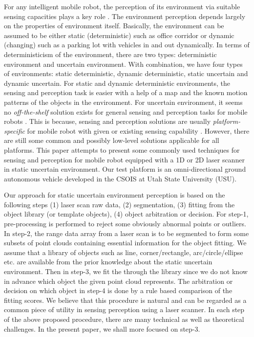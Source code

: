 \documentclass{cdcarta4}
\begin{document}
For any intelligent mobile robot, the perception of its environment via suitable sensing capacities plays a key role \cite{Adams99,Nourbakhsh97}. The  environment perception depends largely on the properties of environment itself. Basically, the environment can be assumed to be either static (deterministic) such as office corridor  or dynamic (changing) such as a   parking lot with vehicles in and out dynamically. In terms of 
deterministicism of the environment, there are two types: deterministic environment and uncertain environment.
With combination, we have four types of environments: static deterministic, dynamic deterministic, static uncertain and dynamic uncertain. For static and dynamic deterministic environments, the sensing and perception task is easier with a help of a map and the known motion patterns of the objects in the environment. For uncertain environment, it seems no {\em off-the-shelf} solution exists for general sensing and perception tasks for mobile robots \cite{Adams99}. This is because,  sensing and perception  solutions  are usually {\em platform-specific}  for mobile robot with given or existing sensing capability \cite{Adams99,Nourbakhsh97}. However, there are still some common and possibly low-level solutions applicable for all platforms. This paper attempts to present some commonly used  techniques for sensing and perception for  mobile robot equipped with a 1D or 2D laser scanner in static uncertain environment.
%
Our test platform is an omni-directional ground autonomous vehicle developed in the CSOIS at Utah State University (USU).



Our approach for static uncertain environment perception is based on the following steps (1) laser scan raw data, (2) segmentation, (3) fitting from the object library (or template objects), (4) object arbitration or decision. 
For step-1, pre-processing is performed to reject some obviously abnormal points or outliers.
In step-2, the range data array from a laser scan is to be segmented to form some subsets of point clouds containing essential information for the object fitting. We assume that a library of objects such as line, corner/rectangle, arc/circle/ellipse etc. are available from the prior knowledge about the static uncertain environment.
Then in step-3, we fit the through the library since we do not know in advance which object the given point cloud represents. The arbitration or decision on which object in step-4 is done by a rule based comparison of the fitting scores. We believe that this procedure is natural and can be regarded as a common piece of utility in sensing perception using a laser scanner. In each step of the above proposed procedure, there are many technical as well as theoretical challenges. In the present paper, we shall more focused on step-3. 
\end{document}
